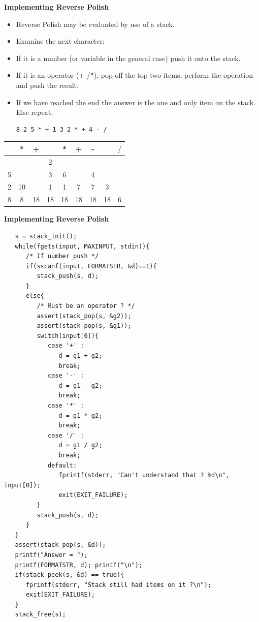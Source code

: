 \newpage
{\samepage
\begin{center}
{\Large{\bf Implementing Reverse Polish}}
\end{center}
\begin{itemize}
\item Reverse Polish may be evaluated by use of a stack.
\item Examine the next character;
\item If it is a number (or variable in the general case)
push it onto the stack.
\item If it is an operator (+-/*), pop off the top two
items, perform the operation and push the result.
\item If we have reached the end the answer is the one and only
item on the stack. Else repeat.
\begin{verbatim}
8 2 5 * + 1 3 2 * + 4 - /
\end{verbatim}
\end{itemize}

\begin{center}
\begin{tabular}{|c|c|c|c|c|c|c|c|c|}\hline
   & * & + &   & * & + & - &   & $/$ \\ \hline
   &   &   & 2 &   &   &   &   &     \\
 5 &   &   & 3 & 6 &   & 4 &   &     \\
 2 & 10&   & 1 & 1 & 7 & 7 & 3 &     \\
 8 & 8 & 18& 18& 18& 18& 18& 18& 6   \\ \hline
\end{tabular}
\end{center}
}

\newpage
{\samepage
\begin{center}
{\Large{\bf Implementing Reverse Polish}}
\end{center}
{\small
\begin{verbatim}
   s = stack_init();
   while(fgets(input, MAXINPUT, stdin)){
      /* If number push */
      if(sscanf(input, FORMATSTR, &d)==1){
         stack_push(s, d);
      }
      else{
         /* Must be an operator ? */
         assert(stack_pop(s, &g2));
         assert(stack_pop(s, &g1));
         switch(input[0]){
            case '+' :
               d = g1 + g2;
               break;
            case '-' :
               d = g1 - g2;
               break;
            case '*' :
               d = g1 * g2;
               break;
            case '/' :
               d = g1 / g2;
               break;
            default:
               fprintf(stderr, "Can't understand that ? %d\n", input[0]);
               exit(EXIT_FAILURE);
         }
         stack_push(s, d);
      }
   }
   assert(stack_pop(s, &d));
   printf("Answer = ");
   printf(FORMATSTR, d); printf("\n");
   if(stack_peek(s, &d) == true){
      fprintf(stderr, "Stack still had items on it ?\n");
      exit(EXIT_FAILURE);
   }
   stack_free(s);
\end{verbatim}
}}

